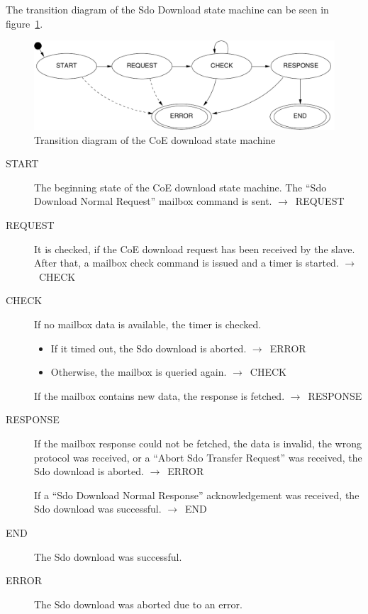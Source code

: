 \documentclass[a4paper,12pt,BCOR6mm,bibtotoc,idxtotoc]{scrbook}
\begin{document}
The transition diagram of the Sdo Download state machine can be seen
in figure~\ref{fig:fsm-coedown}.

\begin{figure}[htbp]
  \centering
  \includegraphics[width=.9\textwidth]{images/fsm-coedown} %
  \caption{Transition diagram of the CoE download state machine}
  \label{fig:fsm-coedown}
\end{figure}


\begin{description}
\item[START] The beginning state of the CoE download state
  machine. The ``Sdo Download Normal Request'' mailbox command is
  sent. $\rightarrow$~REQUEST

\item[REQUEST] It is checked, if the CoE download request has been
  received by the slave. After that, a mailbox check command is issued
  and a timer is started. $\rightarrow$~CHECK

\item[CHECK] If no mailbox data is available, the timer is checked.
  \begin{itemize}
  \item If it timed out, the Sdo download is aborted.
    $\rightarrow$~ERROR
  \item Otherwise, the mailbox is queried again.
    $\rightarrow$~CHECK
  \end{itemize}

  If the mailbox contains new data, the response is fetched.
  $\rightarrow$~RESPONSE

\item[RESPONSE] If the mailbox response could not be fetched, the data
  is invalid, the wrong protocol was received, or a ``Abort Sdo
  Transfer Request'' was received, the Sdo download is aborted.
  $\rightarrow$~ERROR

  If a ``Sdo Download Normal Response'' acknowledgement was received,
  the Sdo download was successful. $\rightarrow$~END

\item[END] The Sdo download was successful.

\item[ERROR] The Sdo download was aborted due to an error.

\end{description}
\end{document}

